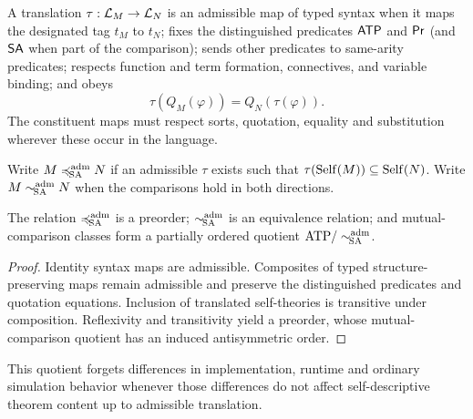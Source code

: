 \documentclass[11pt,letterpaper]{article}
\begin{document}
\begin{definition}
A translation $\tau:\mathcal L_M\to\mathcal L_N$ is an admissible map of typed syntax when it maps the designated tag $t_M$ to $t_N$; fixes the distinguished predicates $\mathsf{ATP}$ and $\mathsf{Pr}$ (and $\mathsf{SA}$ when part of the comparison); sends other predicates to same-arity predicates; respects function and term formation, connectives, and variable binding; and obeys
\[
\tau(Q_M(\varphi))=Q_N(\tau(\varphi)).
\]
The constituent maps must respect sorts, quotation, equality and substitution wherever these occur in the language.
\end{definition}
\begin{definition}
Write $M\preccurlyeq_{\!\mathrm{SA}}^{\mathrm{adm}} N$ if an admissible $\tau$ exists such that $\tau(\operatorname{Self}(M))\subseteq\operatorname{Self}(N)$. Write $M\sim_{\!\mathrm{SA}}^{\mathrm{adm}} N$ when the comparisons hold in both directions.
\end{definition}
\begin{proposition}
The relation $\preccurlyeq_{\!\mathrm{SA}}^{\mathrm{adm}}$ is a preorder; $\sim_{\!\mathrm{SA}}^{\mathrm{adm}}$ is an equivalence relation; and mutual-comparison classes form a partially ordered quotient $\mathrm{ATP}/\sim_{\!\mathrm{SA}}^{\mathrm{adm}}$.
\end{proposition}
\begin{proof}
Identity syntax maps are admissible. Composites of typed structure-preserving maps remain admissible and preserve the distinguished predicates and quotation equations. Inclusion of translated self-theories is transitive under composition. Reflexivity and transitivity yield a preorder, whose mutual-comparison quotient has an induced antisymmetric order.
\end{proof}
This quotient forgets differences in implementation, runtime and ordinary simulation behavior whenever those differences do not affect self-descriptive theorem content up to admissible translation.
\end{document}
